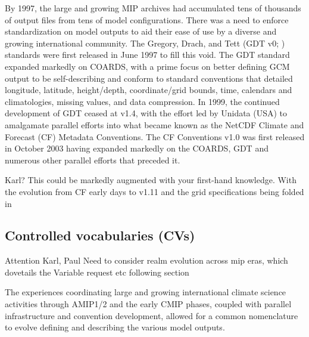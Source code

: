 \documentclass[gmd, preprint]{copernicus}
\newcommand{\mycomment}[1]{}
\def\cred#1{{\color{red}#1}}
\begin{document}
By 1997, the large and growing MIP archives had accumulated tens of thousands of output files from tens of model configurations. There was a need to enforce standardization on model outputs to aid their ease of use by a diverse and growing international community. The Gregory, Drach, and Tett (GDT v0; \citet{gregory_gdt_1999}) standards were first released in June 1997 to fill this void. The GDT standard expanded markedly on COARDS, with a prime focus on better defining GCM output to be self-describing and conform to standard conventions that detailed longitude, latitude, height/depth, coordinate/grid bounds, time, calendars and climatologies, missing values, and data compression. In 1999, the continued development of GDT ceased at v1.4, with the effort led by Unidata (USA) to amalgamate parallel efforts into what became known as the NetCDF Climate and Forecast (CF) Metadata Conventions. The CF Conventions v1.0 was first released in October 2003 having expanded markedly on the COARDS, GDT and numerous other parallel efforts that preceded it.

\cred{Karl? This could be markedly augmented with your first-hand knowledge. With the evolution from CF early days to v1.11 and the grid specifications being folded in}

\mycomment{
https://www.unidata.ucar.edu/software/netcdf/conventions.html
https://www.unidata.ucar.edu/software/netcdf/coords/proposals.html
COARDS 1995 - https://web.archive.org/web/20100527095818/http://ferret.wrc.noaa.gov/noaa_coop/coop_cdf_profile.html
GDT 1997
https://www.unidata.ucar.edu/mailing_lists/archives/netcdfgroup/1997/msg00080.html
https://www.unidata.ucar.edu/software/netcdf/coords/0054.html 1997
https://web.archive.org/web/20100610102527/http://www-pcmdi.llnl.gov/drach/GDT_convention.html 1999
https://web.archive.org/web/20040604041414/http://www-pcmdi.llnl.gov/drach/netCDF.html
CF 2003 - https://cfconventions.org/Data/cf-conventions/cf-conventions-1.11/cf-conventions.html#_version_1_0_28_october_2003 
}


\subsection{Controlled vocabularies (CVs)}
\label{sec:CMIPCVs}
\cred{Attention Karl, Paul Need to consider realm evolution across mip eras, which dovetails the Variable request etc following section}

The experiences coordinating large and growing international climate science activities through AMIP1/2 and the early CMIP phases, coupled with parallel infrastructure and convention development, allowed for a common nomenclature to evolve defining and describing the various model outputs.
\end{document}
